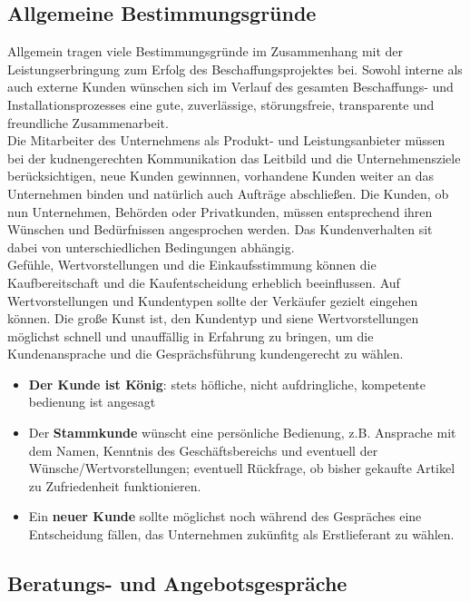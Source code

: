 \documentclass[a4paper, 12pt]{report}
\begin{document}
\begin{multicols}{2}
\subsection{Allgemeine Bestimmungsgründe}

Allgemein tragen viele Bestimmungsgründe im Zusammenhang mit der
Leistungserbringung zum Erfolg des Beschaffungsprojektes bei. Sowohl interne als
auch externe Kunden wünschen sich im Verlauf des gesamten Beschaffungs- und
Installationsprozesses eine gute, zuverlässige, störungsfreie, transparente
und freundliche Zusammenarbeit. \\

Die Mitarbeiter des Unternehmens als Produkt- und Leistungsanbieter müssen bei
der kudnengerechten Kommunikation das Leitbild und die Unternehmensziele
berücksichtigen, neue Kunden gewinnnen, vorhandene Kunden weiter an das
Unternehmen binden und natürlich auch Aufträge abschließen. Die Kunden, ob nun
Unternehmen, Behörden oder Privatkunden, müssen entsprechend ihren Wünschen
und Bedürfnissen angesprochen werden. Das Kundenverhalten sit dabei von
unterschiedlichen Bedingungen abhängig. \\

Gefühle, Wertvorstellungen und die Einkaufsstimmung können die Kaufbereitschaft
und die Kaufentscheidung erheblich beeinflussen. Auf Wertvorstellungen und
Kundentypen sollte der Verkäufer gezielt eingehen können. Die große Kunst ist,
den Kundentyp und siene Wertvorstellungen möglichst schnell und unauffällig in
Erfahrung zu bringen, um die Kundenansprache und die Gesprächsführung
kundengerecht zu wählen.

\begin{itemize}
    \item \textbf{Der Kunde ist König}: stets höfliche, nicht aufdringliche,
	kompetente bedienung ist angesagt
    \item Der \textbf{Stammkunde} wünscht eine persönliche Bedienung, z.B.
	Ansprache mit dem Namen, Kenntnis des Geschäftsbereichs und eventuell
	der Wünsche/Wertvorstellungen; eventuell Rückfrage, ob bisher gekaufte
	Artikel zu Zufriedenheit funktionieren.
    \item Ein \textbf{neuer Kunde} sollte möglichst noch während des Gespräches
	eine Entscheidung fällen, das Unternehmen zukünfitg als
	Erstlieferant zu wählen.
\end{itemize}

\subsection{Beratungs- und Angebotsgespräche}


\end{multicols}
\end{document}
